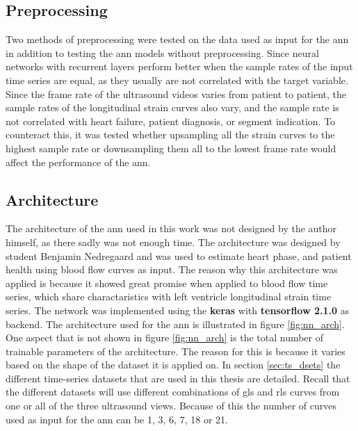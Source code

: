 \subsection{Preprocessing}

Two methods of preprocessing were tested on the data used as input for the \acrshort{ann} in addition to testing the \acrshort{ann} models without preprocessing. Since neural networks with recurrent layers perform better when the sample rates of the input time series are equal, as they usually are not correlated with the target variable. Since the frame rate of the ultrasound videos varies from patient to patient, the sample rates of the longitudinal strain curves also vary, and the sample rate is not correlated with heart failure, patient diagnosis, or segment indication. To counteract this, it was tested whether upsampling all the strain curves to the highest sample rate or downsampling them all to the lowest frame rate would affect the performance of the \acrshort{ann}. 

\subsection{Architecture} \label{sec:ann_architecture}

The architecture of the \acrshort{ann} used in this work was not designed by the author himself, as there sadly was not enough time. The architecture was designed by student Benjamin Nedregaard and was used to estimate heart phase, and patient health using blood flow curves as input. The reason why this architecture was applied is because it showed great promise when applied to blood flow time series, which share charactaristics with left ventricle longitudinal strain time series. The network was implemented using the \textbf{keras} with \textbf{tensorflow 2.1.0} as backend. The architecture used for the \acrshort{ann} is illustrated in figure \ref{fig:nn_arch}. One aspect that is not shown in figure \ref{fig:nn_arch} is the total number of trainable parameters of the architecture. The reason for this is because it varies based on the shape of the dataset it is applied on. In section \ref{sec:ts_dsets} the different time-series datasets that are used in this thesis are detailed. Recall that the different datasets will use different combinations of \acrshort{gls} and \acrshort{rls} curves from one or all of the three ultrasound views. Because of this the number of curves used as input for the \acrshort{ann} can be 1, 3, 6, 7, 18 or 21.

